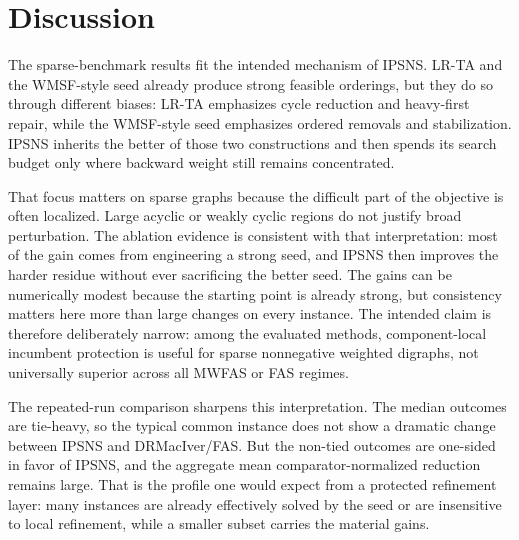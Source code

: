 \section{Discussion}
\label{sec:discussion}

The sparse-benchmark results fit the intended mechanism of IPSNS. LR-TA and the WMSF-style seed already produce strong feasible orderings, but they do so through different biases: LR-TA emphasizes cycle reduction and heavy-first repair, while the WMSF-style seed emphasizes ordered removals and stabilization. IPSNS inherits the better of those two constructions and then spends its search budget only where backward weight still remains concentrated.

That focus matters on sparse graphs because the difficult part of the objective is often localized. Large acyclic or weakly cyclic regions do not justify broad perturbation. The ablation evidence is consistent with that interpretation: most of the gain comes from engineering a strong seed, and IPSNS then improves the harder residue without ever sacrificing the better seed. The gains can be numerically modest because the starting point is already strong, but consistency matters here more than large changes on every instance. The intended claim is therefore deliberately narrow: among the evaluated methods, component-local incumbent protection is useful for sparse nonnegative weighted digraphs, not universally superior across all MWFAS or FAS regimes.

The repeated-run comparison sharpens this interpretation. The median outcomes are tie-heavy, so the typical common instance does not show a dramatic change between IPSNS and DRMacIver/FAS. But the non-tied outcomes are one-sided in favor of IPSNS, and the aggregate mean comparator-normalized reduction remains large. That is the profile one would expect from a protected refinement layer: many instances are already effectively solved by the seed or are insensitive to local refinement, while a smaller subset carries the material gains.

